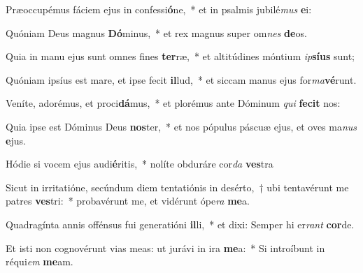\item Præoccupémus fáciem ejus in confessi\textbf{ó}ne,~* et in psalmis jubilé\textit{mus} \textbf{e}i:
\item Quóniam Deus magnus \textbf{Dó}minus,~* et rex magnus super om\textit{nes} \textbf{de}os.
\item Quia in manu ejus sunt omnes fines \textbf{ter}ræ,~* et altitúdines móntium \textit{ip}\textbf{sí}\textbf{us} sunt;
\item Quóniam ipsíus est mare, et ipse fecit \textbf{il}lud,~* et siccam manus ejus for\textit{ma}\textbf{vé}runt.
\item Veníte, adorémus, et proci\textbf{dá}mus,~* et plorémus ante Dóminum \textit{qui} \textbf{fe}\textbf{cit} nos:
\item Quia ipse est Dóminus Deus \textbf{nos}ter,~* et nos pópulus páscuæ ejus, et oves ma\textit{nus} \textbf{e}jus.
\item Hódie si vocem ejus audi\textbf{é}ritis,~* nolíte obduráre cor\textit{da} \textbf{ves}tra
\item Sicut in irritatióne, secúndum diem tentatiónis in desérto,~† ubi tentavérunt me patres \textbf{ves}tri:~* probavérunt me, et vidérunt ópe\textit{ra} \textbf{me}a.
\item Quadragínta annis offénsus fui generatióni \textbf{il}li,~* et dixi: Semper hi er\textit{rant} \textbf{cor}de.
\item Et isti non cognovérunt vias meas: ut jurávi in ira \textbf{me}a:~* Si introíbunt in réqui\textit{em} \textbf{me}am.
